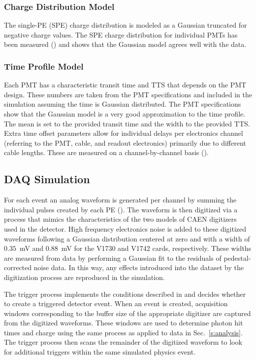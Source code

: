 \subsubsection{Charge Distribution Model}

The single-PE (SPE) charge distribution is modeled as a Gaussian truncated for negative charge values. The SPE charge distribution for individual PMTs has been measured () and  shows that the Gaussian model agrees well with the data.


\subsubsection{Time Profile Model}

Each PMT has a characteristic transit time and TTS that depends on the PMT design. These numbers are taken from the PMT specifications and included in the simulation assuming the time is Gaussian distributed. The PMT specifications~\cite{h11934} show that the Gaussian model is a very good approximation to the time profile. The mean is set to the provided transit time and the width to the provided TTS. Extra time offset parameters allow for individual delays per electronics channel (referring to the PMT, cable, and readout electronics) primarily due to different cable lengths. These are measured on a channel-by-channel basis ().



\subsection{DAQ Simulation \label{sec:daq_sim}}


For each event an analog waveform is generated per channel by summing the individual pulses created by each PE (). 
The waveform is then digitized via a process that mimics the characteristics of the two models of CAEN digitizers used in the detector. 
High frequency electronics noise is added to these digitized waveforms following a Gaussian distribution centered at zero and with a width of $0.35$~mV and $0.88$~mV for the V1730 and V1742 cards, respectively.
These widths are measured from data by performing a Gaussian fit to the residuals of pedestal-corrected noise data.
In this way, any effects introduced into the dataset by the digitization process are reproduced in the simulation.

The trigger process implements the conditions described in  and decides whether to create a triggered detector event. 
When an event is created, acquisition windows corresponding to the buffer size of the appropriate digitizer are captured from the digitized waveforms.
These windows are used to determine photon hit times and charge using the same process as applied to data in Sec.~\ref{s:analysis}.  
The trigger process then scans the remainder of the digitized waveform to look for additional triggers within the same simulated physics event. 


